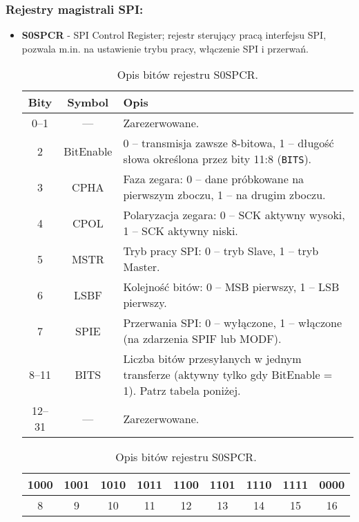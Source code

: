 \subsubsection {Rejestry magistrali SPI:}
\begin{itemize}
    \item \textbf{S0SPCR} - SPI Control Register; rejestr sterujący pracą interfejsu SPI, pozwala m.in. na ustawienie trybu pracy, włączenie SPI i przerwań.
\begin{table}[H]
\centering
\caption{Opis bitów rejestru S0SPCR.}
\vspace{0.5em}
\renewcommand{\arraystretch}{1.2}
\begin{tabular}{|c|c|p{9.5cm}|}
\hline
\rowcolor{gray!30}
\textbf{Bity} & \textbf{Symbol} & \textbf{Opis} \\
\hline
0–1     & —            & Zarezerwowane. \\
\hline
2       &BitEnable  & 0 – transmisja zawsze 8-bitowa, 1 – długość słowa określona przez bity 11:8 (\texttt{BITS}). \\
\hline
3       &CPHA     & Faza zegara: 0 – dane próbkowane na pierwszym zboczu, 1 – na drugim zboczu. \\
\hline
4       & CPOL       & Polaryzacja zegara: 0 – SCK aktywny wysoki, 1 – SCK aktywny niski. \\
\hline
5       & MSTR       & Tryb pracy SPI: 0 – tryb Slave, 1 – tryb Master. \\
\hline
6       & LSBF       & Kolejność bitów: 0 – MSB pierwszy, 1 – LSB pierwszy. \\
\hline
7       & SPIE       & Przerwania SPI: 0 – wyłączone, 1 – włączone (na zdarzenia SPIF lub MODF). \\
\hline
8–11    & BITS       & Liczba bitów przesyłanych w jednym transferze (aktywny tylko gdy BitEnable = 1). Patrz tabela poniżej. \\
\hline
12–31   & —            & Zarezerwowane. \\
\hline
\end{tabular}

\vspace{1em}

\begin{tabular}{|c|c|c|c|c|c|c|c|c|}
\hline
1000 & 1001 & 1010 & 1011 & 1100 & 1101 & 1110 & 1111 & 0000\\
\hline
8    & 9    & 10   & 11   & 12   & 13   & 14   & 15 & 16\\
\hline
\end{tabular}
\end{table}


\end{itemize}
